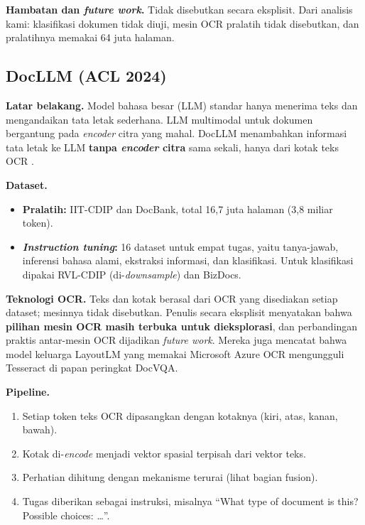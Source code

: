 \textbf{Hambatan dan \textit{future work}.} Tidak disebutkan secara eksplisit. Dari analisis
kami: klasifikasi dokumen tidak diuji, mesin OCR pralatih tidak disebutkan, dan
pralatihnya memakai 64 juta halaman.

\subsection{DocLLM (ACL 2024)}\label{sec:docllm}

\textbf{Latar belakang.} Model bahasa besar (LLM) standar hanya menerima teks dan
mengandaikan tata letak sederhana. LLM multimodal untuk dokumen bergantung pada
\textit{encoder} citra yang mahal. DocLLM menambahkan informasi tata letak ke LLM
\textbf{tanpa \textit{encoder} citra} sama sekali, hanya dari kotak teks OCR
\parencite{wang2024docllm}.

\textbf{Dataset.}
\begin{itemize}
  \item \textbf{Pralatih:} IIT-CDIP dan DocBank, total 16,7 juta halaman (3,8 miliar
  token).
  \item \textbf{\textit{Instruction tuning}:} 16 dataset untuk empat tugas, yaitu
  tanya-jawab, inferensi bahasa alami, ekstraksi informasi, dan klasifikasi. Untuk
  klasifikasi dipakai RVL-CDIP (di-\textit{downsample}) dan BizDocs.
\end{itemize}

\textbf{Teknologi OCR.} Teks dan kotak berasal dari OCR yang disediakan setiap dataset;
mesinnya tidak disebutkan. Penulis secara eksplisit menyatakan bahwa \textbf{pilihan
mesin OCR masih terbuka untuk dieksplorasi}, dan perbandingan praktis antar-mesin OCR
dijadikan \textit{future work}. Mereka juga mencatat bahwa model keluarga LayoutLM yang
memakai Microsoft Azure OCR mengungguli Tesseract di papan peringkat DocVQA.

\textbf{Pipeline.}
\begin{enumerate}
  \item Setiap token teks OCR dipasangkan dengan kotaknya (kiri, atas, kanan, bawah).
  \item Kotak di-\textit{encode} menjadi vektor spasial terpisah dari vektor teks.
  \item Perhatian dihitung dengan mekanisme terurai (lihat bagian fusion).
  \item Tugas diberikan sebagai instruksi, misalnya \enquote{What type of document is this?
  Possible choices: \ldots}.
\end{enumerate}

